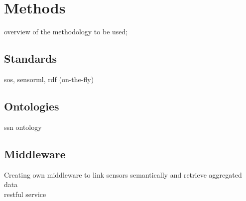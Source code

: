 \chapter{Methods}
\label{chap:methods}

overview of the methodology to be used;

\section{Standards}
\ac{sos}, \ac{sensorml}, \ac{rdf} (on-the-fly)


\section{Ontologies}
\ac{ssn} ontology


\section{Middleware}
Creating own middleware to link sensors semantically and retrieve aggregated data\\

\ac{rest}ful service




